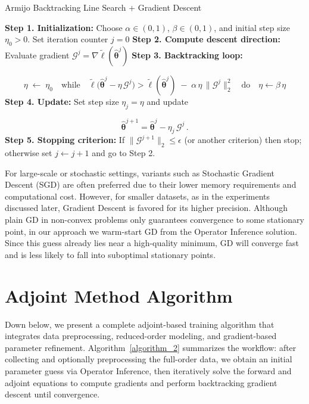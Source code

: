 \begin{center}
\begin{minipage}{0.95\textwidth}
\begin{algorithm}[H]
\label{algorithm_1}
\SetAlgoLined
\caption{Armijo Backtracking Line Search + Gradient Descent}
\textbf{Step 1. Initialization:} Choose $\alpha\in(0,1)$, $\beta\in(0,1)$, and initial step size $\eta_{0} > 0$. Set iteration counter $j=0$\;
\textbf{Step 2. Compute descent direction:} Evaluate gradient $\mathscr{G}^j = \nabla \tilde\ell(\hat{\bm\theta}^j)$\;
\textbf{Step 3. Backtracking loop:}

$$\eta \;\leftarrow\;\eta_{0}
    \quad\text{while}\quad
    \tilde\ell\bigl(\hat{\bm\theta}^j - \eta\,\mathscr{G}^j\bigr)
    >
    \tilde\ell(\hat{\bm\theta}^j)
    \;-\;\alpha\,\eta\,\|\mathscr{G}^j\|_2^2
    \quad\text{do}\quad
    \eta \leftarrow \beta\,\eta$$
\textbf{Step 4. Update:} Set step size $\eta_j = \eta$ and update

$$\hat{\bm\theta}^{j+1} = \hat{\bm\theta}^j - \eta_j\,\mathscr{G}^j\,.$$
\textbf{Step 5. Stopping criterion:} If $\|\mathscr{G}^{j+1}\|_2\le\epsilon$ (or another criterion) then stop; otherwise set $j\leftarrow j+1$ and go to Step 2.
\end{algorithm}
\end{minipage}
\end{center}

For large-scale or stochastic settings, variants such as Stochastic Gradient Descent (SGD) are often preferred \cite{ruder2017overviewgradientdescentoptimization} due to their lower memory requirements and computational cost. However, for smaller datasets, as in the experiments discussed later, Gradient Descent is favored for its higher precision. Although plain GD in non-convex problems only guarantees convergence to some stationary point, in our approach we warm-start GD from the Operator Inference solution. Since this guess already lies near a high-quality minimum, GD will converge fast and is less likely to fall into suboptimal stationary points.


\section{Adjoint Method Algorithm}

Down below, we present a complete adjoint-based training algorithm that integrates data preprocessing, reduced-order modeling, and gradient-based parameter refinement. Algorithm~\ref{algorithm_2} summarizes the workflow: after collecting and optionally preprocessing the full-order data, we obtain an initial parameter guess via Operator Inference, then iteratively solve the forward and adjoint equations to compute gradients and perform backtracking gradient descent until convergence.

